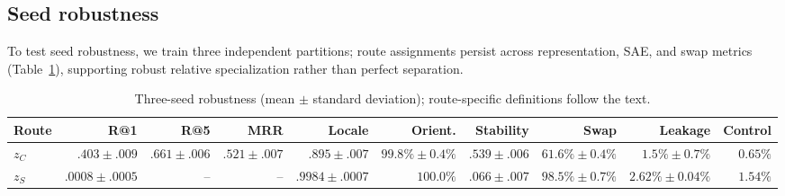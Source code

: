 \documentclass[11pt]{article}
\begin{document}
\subsection{Seed robustness}
\label{app:seed-robustness}
To test seed robustness, we train three independent partitions; route assignments persist across representation, SAE, and swap metrics (Table~\ref{tab:app-seeds}), supporting robust relative specialization rather than perfect separation.

\begin{table}[H]
\centering\scriptsize
\caption{Three-seed robustness (mean $\pm$ standard deviation); route-specific definitions follow the text.}
\label{tab:app-seeds}
\setlength{\tabcolsep}{2pt}
\begin{tabular*}{\columnwidth}{@{\extracolsep{\fill}}lrrrrrrrrr@{}}
\toprule
Route & R@1 & R@5 & MRR & Locale & Orient. & Stability & Swap & Leakage & Control \\
\midrule
$z_C$ & $.403\pm.009$ & $.661\pm.006$ & $.521\pm.007$ & $.895\pm.007$ & $99.8\%\pm0.4\%$ & $.539\pm.006$ & $61.6\%\pm0.4\%$ & $1.5\%\pm0.7\%$ & $0.65\%$ \\
$z_S$ & $.0008\pm.0005$ & -- & -- & $.9984\pm.0007$ & $100.0\%$ & $.066\pm.007$ & $98.5\%\pm0.7\%$ & $2.62\%\pm0.04\%$ & $1.54\%$ \\
\bottomrule
\end{tabular*}
\end{table}
\end{document}
